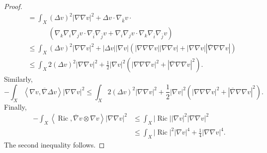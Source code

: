 \documentclass[10pt,a4paper]{amsart}
\DeclareMathOperator{\Ric}{Ric}
\newcommand{\ip}[1]{\left\langle#1\right\rangle}
\newcommand{\oo}[1]{\overline{#1}}
\begin{document}
\begin{proof}
{\begin{align*}
    &= \int_X (\Delta v)^2 |\nabla \nabla v|^2 + \Delta v \cdot \nabla_{\oo{k}} v \cdot\\
    &\quad\quad\quad (\nabla_k \nabla_i \nabla_j v \cdot \nabla_{\oo{i}} \nabla_{\oo{j}} v + \nabla_i \nabla_j v \cdot \nabla_k \nabla_{\oo{i}} \nabla_{\oo{j}} v)\\
    &\leq \int_X (\Delta v)^2 |\nabla \nabla v|^2 + |\Delta v| |\nabla v| (|\nabla \nabla \nabla v| |\nabla \nabla v|+|\nabla \nabla v||\oo{\nabla}\nabla \nabla v|)\\
    &\leq \int_X 2(\Delta v)^2 |\nabla \nabla v|^2 + \frac{1}{2}|\nabla v|^2 (|\nabla \nabla \nabla v|^2 + |\oo{\nabla} \nabla \nabla v|^2).
\end{align*}
}
Similarly,
\begin{equation*}
    -\int_X \ip{\nabla v, \oo{\nabla}\Delta v} |\nabla \nabla v|^2 \leq \int_X 2(\Delta v)^2 |\nabla \nabla v|^2 + \frac{1}{2}|\nabla v|^2 (|\nabla \nabla \nabla v|^2 + |\oo{\nabla} \nabla \nabla v|^2).
\end{equation*}
Finally,
\begin{align*}
    -\int_X \ip{\Ric, \oo{\nabla} v \otimes \nabla v} |\nabla \nabla v|^2 &\leq \int_X |\Ric| |\nabla v|^2 |\nabla \nabla v|^2\\
    &\leq \int_X |\Ric|^2 |\nabla v|^4 + \frac{1}{4}|\nabla \nabla v|^4.
\end{align*}
The second inequality follows.
\end{proof}
\end{document}
